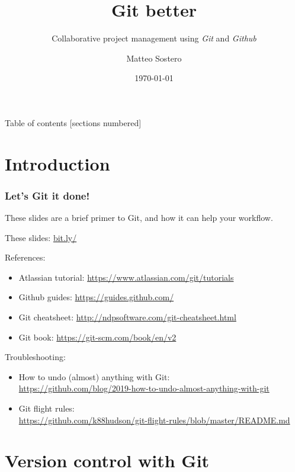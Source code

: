\documentclass[10pt,svgnames,handout]{beamer}
\title{Git better}
\subtitle{Collaborative project management using \emph{Git} and \emph{Github}}
\date{\today}
\author{Matteo Sostero}
\institute{Sant'Anna School of Advanced Studies}
\begin{document}
\maketitle

\begin{frame}{Table of contents}
[sections numbered]
\tableofcontents[hideallsubsections]
\end{frame}

\section{Introduction}

\begin{frame}
\frametitle{Let's Git it done!}
    
These slides are a brief primer to Git, and how it can help your workflow.\medskip

\centerline{These slides: \url{bit.ly/}}
\medskip
\pause

References:
\begin{itemize}
  \item Atlassian tutorial: \url{https://www.atlassian.com/git/tutorials}
  \item Github guides: \url{https://guides.github.com/}
  \item Git cheatsheet: \url{http://ndpsoftware.com/git-cheatsheet.html}
  \item Git book: \url{https://git-scm.com/book/en/v2}
\end{itemize}
\medskip

Troubleshooting:
\begin{itemize}
  \item How to undo (almost) anything with Git:\\
  \url{https://github.com/blog/2019-how-to-undo-almost-anything-with-git}
  \item Git flight rules:\\
  \url{https://github.com/k88hudson/git-flight-rules/blob/master/README.md}
\end{itemize}
\end{frame}



\section{Version control with Git}
\end{document}

